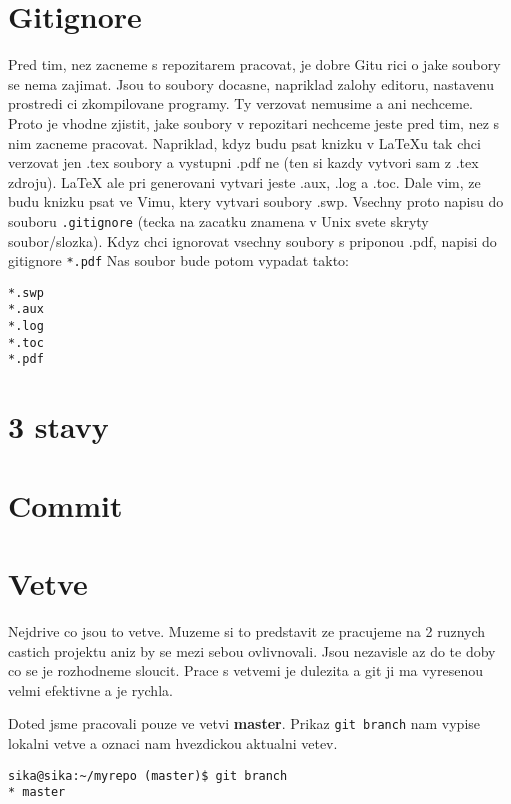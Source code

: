 \documentclass[12pt,a5paper]{article}
\begin{document}
\section{Gitignore}

Pred tim, nez zacneme s repozitarem pracovat, je dobre Gitu rici o jake soubory se nema zajimat. Jsou to soubory docasne, napriklad zalohy editoru, nastavenu prostredi ci zkompilovane programy. Ty verzovat nemusime a ani nechceme. Proto je vhodne zjistit, jake soubory v repozitari nechceme jeste pred tim, nez s nim zacneme pracovat. Napriklad, kdyz budu psat knizku v LaTeXu tak chci verzovat jen .tex soubory a vystupni .pdf ne (ten si kazdy vytvori sam z .tex zdroju). LaTeX ale pri generovani vytvari jeste .aux, .log a .toc. Dale vim, ze budu knizku psat ve Vimu, ktery vytvari soubory .swp. Vsechny proto napisu do souboru \lstinline|.gitignore| (tecka na zacatku znamena v Unix svete skryty soubor/slozka). Kdyz chci ignorovat vsechny soubory s priponou .pdf, napisi do gitignore \lstinline|*.pdf| Nas soubor bude potom vypadat takto:

\begin{lstlisting}
*.swp
*.aux
*.log
*.toc
*.pdf

\end{lstlisting}


\section{3 stavy}
\section{Commit}
\section{Vetve}

Nejdrive co jsou to vetve. Muzeme si to predstavit ze pracujeme na 2 ruznych castich projektu aniz by se mezi sebou ovlivnovali. Jsou nezavisle az do te doby co se je rozhodneme sloucit. Prace s vetvemi je dulezita a git ji ma vyresenou velmi efektivne a je rychla.

Doted jsme pracovali pouze ve vetvi {\bf master}. Prikaz \lstinline|git branch| nam vypise lokalni vetve a oznaci nam hvezdickou aktualni vetev.

\begin{lstlisting}
sika@sika:~/myrepo (master)$ git branch
* master
\end{lstlisting}
\end{document}

